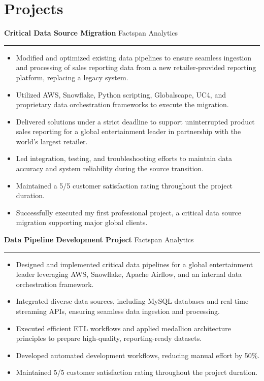 \section*{Projects}
\textbf{Critical Data Source Migration} \hfill Factspan Analytics  
\vspace{0.2cm}  
\hrule  
\vspace{0.2cm}  
\begin{itemize}
    \item Modified and optimized existing data pipelines to ensure seamless ingestion and processing of sales reporting data from a new retailer-provided reporting platform, replacing a legacy system.
    \item Utilized AWS, Snowflake, Python scripting, Globalscape, UC4, and proprietary data orchestration frameworks to execute the migration.
    \item Delivered solutions under a strict deadline to support uninterrupted product sales reporting for a global entertainment leader in partnership with the world’s largest retailer.
    \item Led integration, testing, and troubleshooting efforts to maintain data accuracy and system reliability during the source transition.
    \item Maintained a 5/5 customer satisfaction rating throughout the project duration.
    \item Successfully executed my first professional project, a critical data source migration supporting major global clients.
\end{itemize}
\vspace{0.5cm}
\textbf{Data Pipeline Development Project} \hfill Factspan Analytics
\vspace{0.2cm}
\hrule
\vspace{0.2cm}
\begin{itemize}
    \item Designed and implemented critical data pipelines for a global entertainment leader leveraging AWS, Snowflake, Apache Airflow, and an internal data orchestration framework.
    \item Integrated diverse data sources, including MySQL databases and real-time streaming APIs, ensuring seamless data ingestion and processing.
    \item Executed efficient ETL workflows and applied medallion architecture principles to prepare high-quality, reporting-ready datasets.
    \item Developed automated development workflows, reducing manual effort by 50\%.
    \item Maintained 5/5 customer satisfaction rating throughout the project duration.
\end{itemize}



